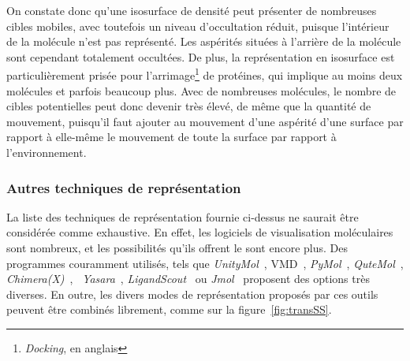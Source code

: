 \begin{appendices}
	
	On constate donc qu'une isosurface de densité peut présenter de nombreuses cibles mobiles, avec toutefois un niveau d'occultation réduit, puisque l'intérieur de la molécule n'est pas représenté. Les aspérités situées à \og l'arrière \fg{} de la molécule sont cependant totalement occultées. De plus, la représentation en isosurface est particulièrement prisée pour l'arrimage\footnote{\emph{Docking}, en anglais} de protéines, qui implique au moins deux molécules et parfois beaucoup plus. Avec de nombreuses molécules, le nombre de cibles potentielles peut donc devenir très élevé, de même que la quantité de mouvement, puisqu'il faut ajouter au mouvement d'une aspérité d'une surface par rapport à elle-même le mouvement de toute la surface par rapport à l'environnement.
	
	\subsubsection{Autres techniques de représentation}
	La liste des techniques de représentation fournie ci-dessus ne saurait être considérée comme exhaustive. En effet, les logiciels de visualisation moléculaires sont nombreux, et les possibilités qu'ils offrent le sont encore plus. Des programmes couramment utilisés, tels que \emph{UnityMol}~\cite{doutreligne2014unitymol}, VMD~\cite{humphrey1996vmd}, \emph{PyMol}~\cite{delano2002pymol}, \emph{QuteMol}~\cite{tarini2006ambient, tarini2006qutemol}, \emph{Chimera(X)}~\cite{pettersen2004ucsf, goddard2017ucsf}, ~\emph{Yasara}~\cite{krieger2014yasara}, \emph{LigandScout}~\cite{wolber2005ligandscout} ou \emph{Jmol}~\cite{herraez2006biomolecules} proposent des options très diverses. En outre, les divers modes de représentation proposés par ces outils peuvent être combinés librement, comme sur la figure~\ref{fig:transSS}.
	

\end{appendices}

